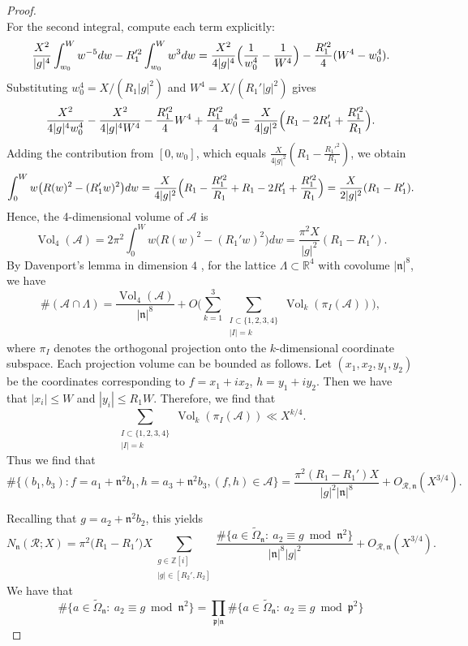\documentclass{amsart}
\newcommand{\R}{\mathbb{R}}
\newcommand{\Z}{\mathbb{Z}}
\theoremstyle{plain}
\theoremstyle{definition}
\theoremstyle{remark}
\numberwithin{equation}{section}
\begin{document}
\begin{proof}
\[\]
For the second integral, compute each term explicitly:
\[
\frac{X^2}{|g|^4} \int_{w_0}^{W} w^{-5} dw - R_1'^2 \int_{w_0}^{W} w^3 dw
= \frac{X^2}{4 |g|^4} \Bigl( \frac{1}{w_0^4} - \frac{1}{W^4} \Bigr) - \frac{R_1'^2}{4} (W^4 - w_0^4).
\]
Substituting $w_0^4 = X/(R_1 |g|^2)$ and $W^4 = X/(R_1' |g|^2)$ gives
\[
\frac{X^2}{4 |g|^4 w_0^4} - \frac{X^2}{4 |g|^4 W^4} - \frac{R_1'^2}{4} W^4 + \frac{R_1'^2}{4} w_0^4
= \frac{X}{4 |g|^2} \Bigl( R_1 - 2 R_1' + \frac{R_1'^2}{R_1} \Bigr).
\] 
Adding the contribution from $[0,w_0]$, which equals $\frac{X}{4 |g|^2} \left(R_1 - \frac{R_1'^2}{R_1}\right)$, we obtain
\[
\int_0^W w \bigl(R(w)^2 - (R_1' w)^2\bigr) dw
= \frac{X}{4 |g|^2} \Bigl(R_1 - \frac{R_1'^2}{R_1} + R_1 - 2 R_1' + \frac{R_1'^2}{R_1} \Bigr)
= \frac{X}{2 |g|^2} (R_1 - R_1').
\]
Hence, the 4-dimensional volume of $\mathcal A$ is
\[
\operatorname{Vol}_4(\mathcal A) = 2 \pi^2 \int_0^W w \bigl(R(w)^2 - (R_1' w)^2\bigr) dw
= \frac{\pi^2 X}{|g|^2} (R_1 - R_1').
\] 
By Davenport's lemma in dimension $4$ \cite[Theorem on p.~180]{Davenport}, for the lattice $\Lambda \subset \R^4$ with covolume $|\mathfrak n|^8$, we have
\[
\#(\mathcal A \cap \Lambda) = \frac{\operatorname{Vol}_4(\mathcal A)}{|\mathfrak n|^8} + O\Bigg(\sum_{k=1}^{3} \sum_{\substack{I\subset \{1,2,3,4\} \\ |I|=k}} \operatorname{Vol}_k(\pi_I(\mathcal A)) \Bigg),
\]
where $\pi_I$ denotes the orthogonal projection onto the $k$-dimensional coordinate subspace. Each projection volume can be bounded as follows.
Let $(x_1,x_2,y_1,y_2)$ be the coordinates corresponding to $f = x_1+ix_2$, $h = y_1+iy_2$. Then we have that $|x_i|\leq W$ and $|y_i|\leq R_1 W$. Therefore, we find that 
\[\sum_{\substack{I\subset \{1,2,3,4\} \\ |I|=k}} \operatorname{Vol}_k(\pi_I(\mathcal A))\ll X^{k/4}.\]
Thus we find that
\[
\#\{(b_1,b_3): f = a_1 + \mathfrak n^2 b_1, h = a_3 + \mathfrak n^2 b_3, (f,h) \in \mathcal A\} = \frac{\pi^2 (R_1 - R_1') X}{ |g|^2 |\mathfrak n|^8} + O_{\mathcal{R},\mathfrak n}(X^{3/4}).
\]
\par Recalling that $g=a_2+\mathfrak n^2 b_2$, this yields
\[
N_{\mathfrak n}(\mathcal R;X)
=
\pi^2
\bigl(R_1-R_1'\bigr)
X\sum_{\substack{g\in\Z[i]\\ |g|\in[R_2',R_2]}} \frac{\#\{a\in\widetilde{\Omega}_{\mathfrak n}:\ a_2\equiv g \bmod \mathfrak n^2\}}{|\mathfrak{n}|^8|g|^{2}}
+
O_{\mathcal R, \mathfrak n}(X^{3/4}).
\]
We have that
\[\#\{a\in\widetilde{\Omega}_{\mathfrak n}:\ a_2\equiv g \bmod \mathfrak n^2\}=\prod_{\mathfrak p|\mathfrak n} \#\{a\in\widetilde{\Omega}_{\mathfrak n}:\ a_2\equiv g \bmod \mathfrak p^2\}\]

\end{proof}
\end{document}
